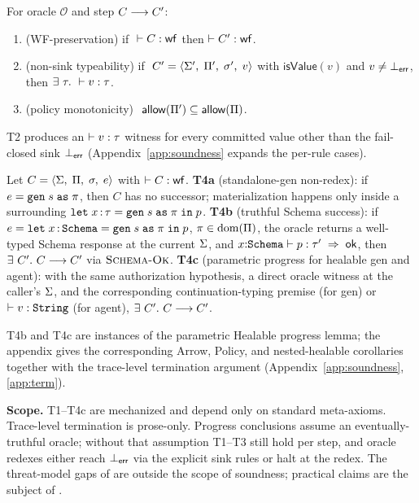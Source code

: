 \begin{theorem}[Soundness]
\label{thm:pact-soundness}
For oracle $\mathcal{O}$ and step $C \step C'$:
\begin{enumerate}
  \item[\textbf{T1}] (WF-preservation) if $~\WF{C}$ then $\WF{C'}$.
  \item[\textbf{T2}] (non-sink typeability) if $~C' = \MConfigS{\MErr'}{\MPol'}{\MStore'}{v}$ with $\mathsf{isValue}(v)$ and $v \neq \errV$, then $\exists~\tau.\ \StType{v}{\tau}$.
  \item[\textbf{T3}] (policy monotonicity) $~\Allow{\MPol'} \subseteq \Allow{\MPol}$.
\end{enumerate}
\end{theorem}

T2 produces an $\StType{v}{\tau}$ witness for every committed value
other than the fail-closed sink $\errV$ (Appendix~\ref{app:soundness}
expands the per-rule cases).

\begin{theorem}
\label{thm:pact-progress}
{\sloppy Let $C = \MConfigS{\MErr}{\MPol}{\MStore}{e}$ with $\WF{C}$.
\textbf{T4a} (standalone-gen non-redex): if $e = \Gen{\tau}{s}{\MPrin}$,
then $C$ has no successor; materialization happens only inside a
surrounding $\Let{\tau}{\Gen{\tau}{s}{\MPrin}}{p}$.
\textbf{T4b} (truthful Schema success): if
$e = \Let{\Tschema}{\Gen{\Tschema}{s}{\MPrin}}{p}$,
$\PolAllow{\MPol}{\MPrin}{\texttt{gen}}$, the oracle returns a
well-typed Schema response at the current $\MErr$, and
$\TJok{\Gext{x}{\Tschema}}{p}{\tau'}$, then $\exists~C'.\ C \step C'$
via $\rulename{Schema-Ok}$.
\textbf{T4c} (parametric progress for healable gen and agent): with the
same authorization hypothesis, a direct oracle witness at the caller's
$\MErr$, and the corresponding continuation-typing premise (for gen) or
$\StType{v}{\Tstring}$ (for agent), $\exists~C'.\ C \step C'$.\par}
\end{theorem}

T4b and T4c are instances of the parametric Healable progress lemma;
the appendix gives the corresponding Arrow, Policy, and nested-healable
corollaries together with the trace-level termination argument
(Appendix~\ref{app:soundness}, \ref{app:term}).

\begin{sloppypar}
\noindent\textbf{Scope.} T1--T4c are mechanized and depend only on
standard meta-axioms.
Trace-level termination is prose-only. Progress conclusions assume an
eventually-truthful oracle; without that assumption T1--T3 still hold
per step, and oracle redexes either reach $\errV$ via the explicit sink
rules or halt at the redex. The threat-model gaps of
 are outside the scope of soundness; practical
claims are the subject of .
\end{sloppypar}
